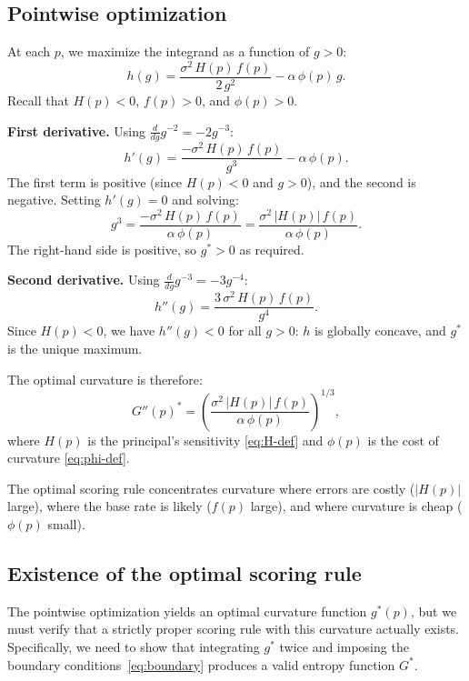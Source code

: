 \documentclass[11pt]{article}
\begin{document}
\subsection{Pointwise optimization}

At each $p$, we maximize the integrand as a function of $g > 0$:
\[
h(g) = \frac{\sigma^2\, H(p)\, f(p)}{2\, g^2} - \alpha\, \phi(p)\, g.
\]
Recall that $H(p) < 0$, $f(p) > 0$, and $\phi(p) > 0$.

\textbf{First derivative.} Using $\frac{d}{dg} g^{-2} = -2g^{-3}$:
\[
h'(g) = \frac{-\sigma^2\, H(p)\, f(p)}{g^3} - \alpha\, \phi(p).
\]
The first term is positive (since $H(p) < 0$ and $g > 0$), and the second is negative. Setting $h'(g) = 0$ and solving:
\begin{equation}\label{eq:g-cubed}
g^3 = \frac{-\sigma^2\, H(p)\, f(p)}{\alpha\, \phi(p)} = \frac{\sigma^2\, |H(p)|\, f(p)}{\alpha\, \phi(p)}.
\end{equation}
The right-hand side is positive, so $g^* > 0$ as required.

\textbf{Second derivative.} Using $\frac{d}{dg} g^{-3} = -3g^{-4}$:
\[
h''(g) = \frac{3\,\sigma^2\, H(p)\, f(p)}{g^4}.
\]
Since $H(p) < 0$, we have $h''(g) < 0$ for all $g > 0$: $h$ is globally concave, and $g^*$ is the unique maximum.

The optimal curvature is therefore:
\begin{equation}\label{eq:optimal-curvature}
\boxed{G''(p)^* = \left( \frac{\sigma^2\,|H(p)|\,f(p)}{\alpha\,\phi(p)} \right)^{1/3},}
\end{equation}
where $H(p)$ is the principal's sensitivity \eqref{eq:H-def} and $\phi(p)$ is the cost of curvature \eqref{eq:phi-def}.

The optimal scoring rule concentrates curvature where errors are costly ($|H(p)|$ large), where the base rate is likely ($f(p)$ large), and where curvature is cheap ($\phi(p)$ small).

\subsection{Existence of the optimal scoring rule}

The pointwise optimization yields an optimal curvature function $g^*(p)$, but we must verify that a strictly proper scoring rule with this curvature actually exists. Specifically, we need to show that integrating $g^*$ twice and imposing the boundary conditions~\eqref{eq:boundary} produces a valid entropy function $G^*$.
\end{document}
